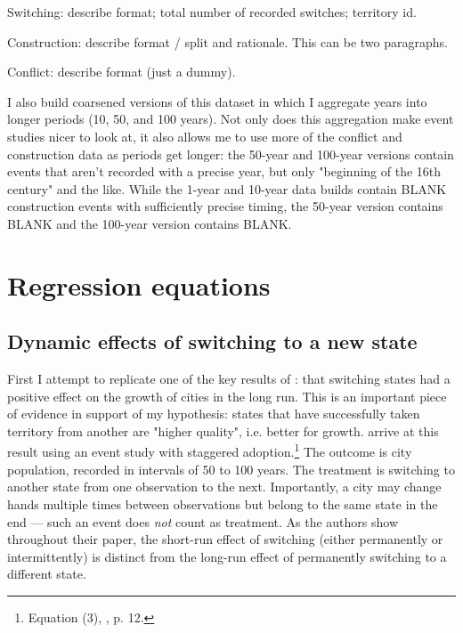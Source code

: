 \documentclass[11pt, a4paper]{article}
\begin{document}
Switching: describe format; total number of recorded switches; territory id.

Construction: describe format / split and rationale. This can be two paragraphs.

Conflict: describe format (just a dummy).


I also build coarsened versions of this dataset in which I aggregate years into longer periods (10, 50, and 100 years). Not only does this aggregation make event studies nicer to look at, it also allows me to use more of the conflict and construction data as periods get longer: the 50-year and 100-year versions contain events that aren't recorded with a precise year, but only "beginning of the 16th century" and the like. While the 1-year and 10-year data builds contain BLANK construction events with sufficiently precise timing, the 50-year version contains BLANK and the 100-year version contains BLANK.



\section{Regression equations}

\subsection{Dynamic effects of switching to a new state}

First I attempt to replicate one of the key results of \cite{schoenholzer2022}: that switching states had a positive effect on the growth of cities in the long run. This is an important piece of evidence in support of my hypothesis: states that have successfully taken territory from another are "higher quality", i.e. better for growth. \cite{schoenholzer2022} arrive at this result using an event study with staggered adoption.\footnote
{
    Equation (3), \citealp{schoenholzer2022}, p. 12.
}
The outcome is city population, recorded in intervals of 50 to 100 years. The treatment is switching to another state from one observation to the next. Importantly, a city may change hands multiple times between observations but belong to the same state in the end --- such an event does \textit{not} count as treatment. As the authors show throughout their paper, the short-run effect of switching (either permanently or intermittently) is distinct from the long-run effect of permanently switching to a different state.
\end{document}

